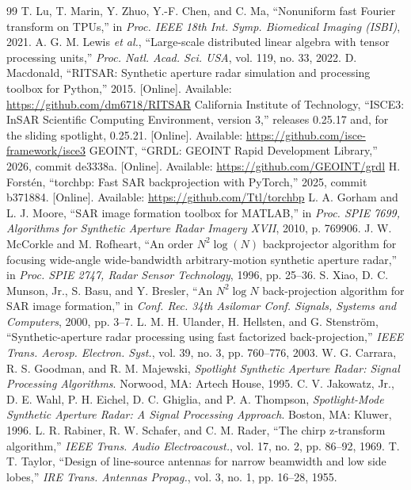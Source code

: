 \documentclass[11pt]{article}
\begin{document}
\begin{thebibliography}{99}
 T. Lu, T. Marin, Y. Zhuo, Y.-F. Chen, and C. Ma, ``Nonuniform fast Fourier transform on TPUs,'' in \emph{Proc. IEEE 18th Int. Symp. Biomedical Imaging (ISBI)}, 2021.
 A. G. M. Lewis \emph{et al.}, ``Large-scale distributed linear algebra with tensor processing units,'' \emph{Proc. Natl. Acad. Sci. USA}, vol. 119, no. 33, 2022.
 D. Macdonald, ``RITSAR: Synthetic aperture radar simulation and processing toolbox for Python,'' 2015. [Online]. Available: \url{https://github.com/dm6718/RITSAR}
 California Institute of Technology, ``ISCE3: InSAR Scientific Computing Environment, version 3,'' releases 0.25.17 and, for the sliding spotlight, 0.25.21. [Online]. Available: \url{https://github.com/isce-framework/isce3}
 GEOINT, ``GRDL: GEOINT Rapid Development Library,'' 2026, commit de3338a. [Online]. Available: \url{https://github.com/GEOINT/grdl}
 H. Forst\'en, ``torchbp: Fast SAR backprojection with PyTorch,'' 2025, commit b371884. [Online]. Available: \url{https://github.com/Ttl/torchbp}
 L. A. Gorham and L. J. Moore, ``SAR image formation toolbox for MATLAB,'' in \emph{Proc. SPIE 7699, Algorithms for Synthetic Aperture Radar Imagery XVII}, 2010, p. 769906.
 J. W. McCorkle and M. Rofheart, ``An order $N^2 \log(N)$ backprojector algorithm for focusing wide-angle wide-bandwidth arbitrary-motion synthetic aperture radar,'' in \emph{Proc. SPIE 2747, Radar Sensor Technology}, 1996, pp. 25--36.
 S. Xiao, D. C. Munson, Jr., S. Basu, and Y. Bresler, ``An $N^2 \log N$ back-projection algorithm for SAR image formation,'' in \emph{Conf. Rec. 34th Asilomar Conf. Signals, Systems and Computers}, 2000, pp. 3--7.
 L. M. H. Ulander, H. Hellsten, and G. Stenstr\"om, ``Synthetic-aperture radar processing using fast factorized back-projection,'' \emph{IEEE Trans. Aerosp. Electron. Syst.}, vol. 39, no. 3, pp. 760--776, 2003.
 W. G. Carrara, R. S. Goodman, and R. M. Majewski, \emph{Spotlight Synthetic Aperture Radar: Signal Processing Algorithms}. Norwood, MA: Artech House, 1995.
 C. V. Jakowatz, Jr., D. E. Wahl, P. H. Eichel, D. C. Ghiglia, and P. A. Thompson, \emph{Spotlight-Mode Synthetic Aperture Radar: A Signal Processing Approach}. Boston, MA: Kluwer, 1996.
 L. R. Rabiner, R. W. Schafer, and C. M. Rader, ``The chirp z-transform algorithm,'' \emph{IEEE Trans. Audio Electroacoust.}, vol. 17, no. 2, pp. 86--92, 1969.
 T. T. Taylor, ``Design of line-source antennas for narrow beamwidth and low side lobes,'' \emph{IRE Trans. Antennas Propag.}, vol. 3, no. 1, pp. 16--28, 1955.

\end{thebibliography}
\end{document}
